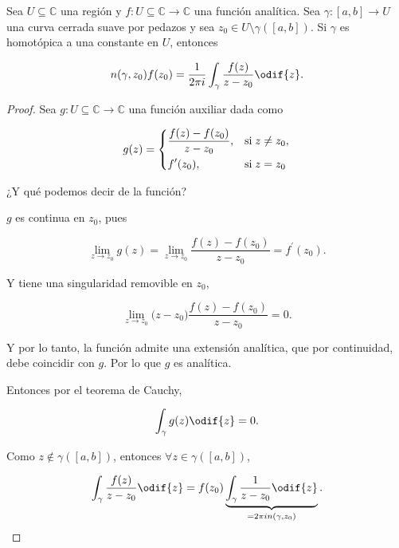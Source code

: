 \documentclass[../main.tex]{subfiles}
\begin{document}
\begin{theorem}
    Sea \(U \subseteq \mathbb{C}\) una región y \(f \colon U \subseteq \mathbb{C} \to
    \mathbb{C}\) una función analítica. Sea \(\gamma \colon [a, b] \to U\) una curva
    cerrada suave por pedazos y sea \(z_{0}\in  U\setminus \gamma([a, b])\). Si
    \(\gamma\) es homotópica a una constante en \(U\), entonces

    \begin{equation*}
        n(\gamma, z_{0})f(z_{0}) = \dfrac{1}{2\pi i} \int_{\gamma}^{}\dfrac{f(z)}{z -
        z_{0}}\odif{z}.
    \end{equation*}
\end{theorem}

\begin{proof}
    Sea \(g \colon U \subseteq \mathbb{C} \to \mathbb{C}\) una función
    auxiliar dada como

    \begin{equation*}
        g(z) =
        \begin{dcases}
            \dfrac{f(z) - f(z_{0})}{z - z_{0}}, &\text{si}\; z \neq z_{0},\\
            f^{\prime}(z_{0}), &\text{si}\; z = z_{0}
        \end{dcases}
    \end{equation*}

    ¿Y qué podemos decir de la función?

    \(g\) es continua en \(z_{0}\), pues

    \begin{equation*}
        \lim_{z \to z_{0}} g(z) = \lim_{z \to z_{0}} \dfrac{f(z) -
        f(z_{0})}{z - z_{0}} =
        f^{\prime}(z_{0}).
    \end{equation*}

    Y tiene una singularidad removible en \(z_{0}\),

    \begin{equation*}
        \lim_{z \to z_{0}} \bigl(z - z_{0}\bigr)\dfrac{f(z) - f(z_{0})}{z - z_{0}} = 0.
    \end{equation*}

    Y por lo tanto,  la función admite una extensión analítica, que por
    continuidad, debe
    coincidir con \(g\). Por lo que \(g\) es analítica.

    Entonces por el teorema de Cauchy,

    \begin{equation*}
        \int_{\gamma}^{}g(z)\odif{z} = 0.
    \end{equation*}

    Como \(z\notin \gamma([a, b])\), entonces \(\forall z\in \gamma([a, b])\),

    \begin{equation*}
        \int_{\gamma}^{}\dfrac{f(z)}{z - z_{0}}\odif{z} =
        f(z_{0})\underbrace{\int_{\gamma}^{}\dfrac{1}{z - z_{0}}\odif{z}}_{=
            2\pi i n(\gamma,
        z_{0})}.
    \end{equation*}
\end{proof}
\end{document}
